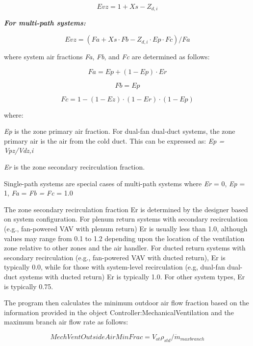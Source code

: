 \begin{equation}
Evz = 1 + Xs - Z_{d,i}
\end{equation}

\textbf{\emph{For multi-path systems:}}

\begin{equation}
Evz = (Fa + Xs·Fb - Z_{d,i}·Ep·Fc)/Fa
\end{equation}

where system air fractions \emph{Fa}, \emph{Fb}, and \emph{Fc} are determined as follows:

\begin{equation}
Fa = Ep + {(1 - Ep) · Er}
\end{equation}

\begin{equation}
Fb = Ep
\end{equation}

\begin{equation}
Fc = 1 - (1 - Ez) · (1 - Er) · (1 - Ep)
\end{equation}

where:

\emph{Ep} is the zone primary air fraction. For dual-fan dual-duct systems, the zone primary air is the air from the cold duct.  This can be expressed as: \emph{Ep = Vpz/Vdz,i}

\emph{Er} is the zone secondary recirculation fraction.

Single-path systems are special cases of multi-path systems where \emph{Er} = 0, \emph{Ep} = 1, \emph{Fa} = \emph{Fb =} \emph{Fc} = 1.0

The zone secondary recirculation fraction Er is determined by the designer based on system configuration. For plenum return systems with secondary recirculation (e.g., fan-powered VAV with plenum return) Er is usually less than 1.0, although values may range from 0.1 to 1.2 depending upon the location of the ventilation zone relative to other zones and the air handler. For ducted return systems with secondary recirculation (e.g., fan-powered VAV with ducted return), Er is typically 0.0, while for those with system-level recirculation (e.g, dual-fan dual-duct systems with ducted return) Er is typically 1.0. For other system types, Er is typically 0.75.

The program then calculates the minimum outdoor air flow fraction based on the information provided in the object Controller:MechanicalVentilation and the maximum branch air flow rate as follows:

\begin{equation}
MechVentOutsideAirMinFrac = {V_{ot}} {\rho_{std}} / {\dot m_{maxbranch}}
\end{equation}

